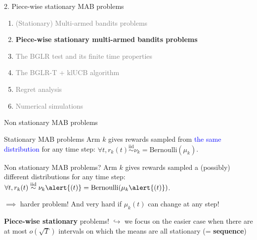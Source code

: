 \documentclass[11pt,english,ignorenonframetext,]{beamer}
\begin{document}
\begin{frame}{2. Piece-wise stationary MAB problems}

  \begin{enumerate}
    \item
    \textcolor{gray}{
      (Stationary) Multi-armed bandits problems
    }
    \vspace*{15pt}

    \item
    \alert{\textbf{%
      Piece-wise stationary multi-armed bandits problems
    }}
    \vspace*{15pt}

    \item
    \textcolor{gray}{
      The BGLR test and its finite time properties
    }
    \vspace*{15pt}

    \item
    \textcolor{gray}{
      The BGLR-T + klUCB algorithm
    }
    \vspace*{15pt}

    \item
    \textcolor{gray}{
      Regret analysis
    }
    \vspace*{15pt}

    \item
    \textcolor{gray}{
      Numerical simulations
    }
  \end{enumerate}

\end{frame}


\begin{frame}{Non stationary MAB problems}

  \begin{block}{Stationary MAB problems}
    Arm $k$ gives rewards sampled from \textcolor{blue}{the same distribution} for any time step:
    $\forall t, r_k(t) \overset{\text{iid}}{\sim} \nu_k = \mathrm{Bernoulli}(\mu_k)$.
  \end{block}

  \pause
  \begin{alertblock}{Non stationary MAB problems?}
    Arm $k$ gives rewards sampled a \alert{(possibly) different distributions} for any time step:
    $\forall t, r_k(t) \overset{\text{iid}}{\sim} \nu_k\alert{(t)} = \mathrm{Bernoulli}(\mu_k\alert{(t)})$.
  \end{alertblock}

  $\implies$ \dXey{} harder problem!
  And very hard if $\mu_k(t)$ can change at any step!

  \pause
  \begin{block}{\textbf{Piece-wise stationary} problems!}
    $\hookrightarrow$ we focus on the easier case when there are at most $o(\sqrt{T})$ intervals on which the means are all stationary (= \textbf{sequence})
  \end{block}
\end{frame}
\end{document}
